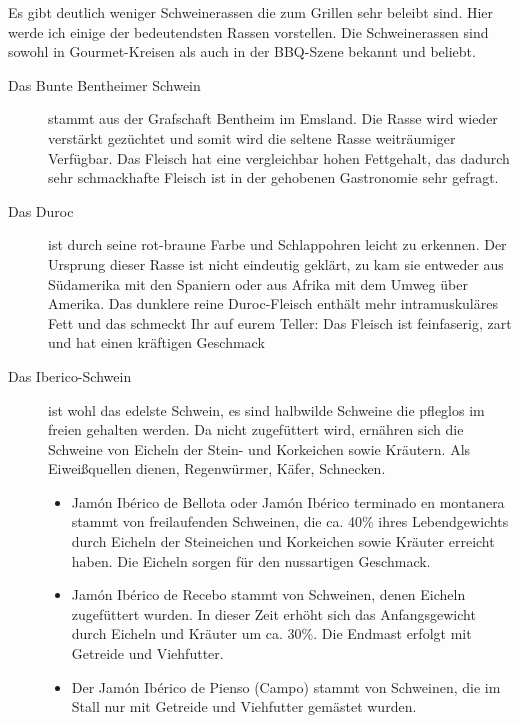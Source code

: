 Es gibt deutlich weniger Schweinerassen die zum Grillen sehr beleibt 
sind. Hier werde ich einige der bedeutendsten Rassen vorstellen. Die 
Schweinerassen  sind sowohl in Gourmet-Kreisen als auch in der 
BBQ-Szene bekannt und beliebt.

\begin{description}
	\item[Das Bunte Bentheimer Schwein] stammt aus der Grafschaft 
	Bentheim im Emsland. Die Rasse wird wieder verstärkt gezüchtet und 
	somit wird die seltene Rasse weiträumiger Verfügbar. Das Fleisch hat 
	eine vergleichbar hohen Fettgehalt, das dadurch sehr schmackhafte 
	Fleisch ist in der gehobenen Gastronomie sehr gefragt.
	\item[Das Duroc] ist durch seine rot-braune Farbe und Schlappohren 
	leicht zu erkennen. Der Ursprung dieser Rasse ist nicht eindeutig 
	geklärt, zu kam sie entweder aus Südamerika mit den Spaniern oder 
	aus Afrika mit dem Umweg über Amerika. Das dunklere reine 
	Duroc-Fleisch enthält mehr intramuskuläres Fett und das schmeckt 
	Ihr auf eurem Teller: Das Fleisch ist feinfaserig, zart und hat einen 
	kräftigen Geschmack
	\item[Das Iberico-Schwein] ist wohl das edelste Schwein, es sind 
	halbwilde Schweine die pfleglos im freien gehalten werden. Da nicht 
	zugefüttert wird, ernähren sich die Schweine von Eicheln der Stein- 
	und Korkeichen sowie Kräutern. Als Eiweißquellen dienen, 
	Regenwürmer, Käfer, Schnecken. 
	\begin{itemize}[noitemsep]
		\item Jamón Ibérico de Bellota oder Jamón Ibérico terminado en 
		montanera stammt von freilaufenden Schweinen, die ca. 40\% ihres 
		Lebendgewichts durch Eicheln der Steineichen und Korkeichen 
		sowie Kräuter erreicht haben. Die Eicheln sorgen für den nussartigen 
		Geschmack.
		\item Jamón Ibérico de Recebo stammt von Schweinen, denen Eicheln 
		zugefüttert wurden. In dieser Zeit erhöht sich das Anfangsgewicht 
		durch Eicheln und Kräuter um ca. 30\%. Die Endmast erfolgt mit 
		Getreide und Viehfutter.
		\item Der Jamón Ibérico de Pienso (Campo) stammt von Schweinen, 
		die im Stall nur mit Getreide und Viehfutter gemästet wurden.
	\end{itemize}
\end{description}




